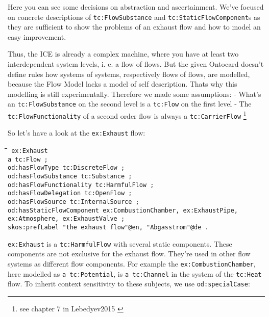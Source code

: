 \documentclass[a4paper,11pt]{article}
\newenvironment{code}{\tt \begin{tabbing}
\hskip12pt\=\hskip12pt\=\hskip12pt\=\hskip12pt\=\hskip5cm\=\hskip5cm\=\kill}
{\end{tabbing}}
\begin{document}
\begin{itemize}
    Here you can see some decisions on abstraction and ascertainment. We've
    focused on concrete descriptions of \texttt{tc:FlowSubstance} and
    \texttt{tc:StaticFlowComponent}s as they are sufficient to show the 
    problems of an exhaust flow and how to model an easy improvement.

    Thus, the ICE is already a complex machine, where you have at least
    two interdependent system levels, i. e. a flow of flows. But the given 
    Ontocard doesn't define rules how systems of systems, respectively flows 
    of flows, are modelled, because the Flow Model lacks a model of self 
    description. Thats why this modelling is still experimentally. Therefore we
    made some assumptions:
    - What's an \texttt{tc:FlowSubstance} on the second level is a 
    \texttt{tc:Flow} on the first level
    - The \texttt{tc:FlowFunctionality} of a second order flow is always a 
    \texttt{tc:CarrierFlow} \footnote{see chapter 7 in Lebedyev2015 
    \cite{Lebedyev2015} }

    So let's have a look at the \texttt{ex:Exhaust} flow:
    \begin{code}\tt
        ex:Exhaust \\
        \> a tc:Flow ; \\
        \> od:hasFlowType tc:DiscreteFlow ; \\
        \> od:hasFlowSubstance tc:Substance ; \\
        \> od:hasFlowFunctionality tc:HarmfulFlow ; \\
        \> od:hasFlowDelegation tc:OpenFlow ; \\
        \> od:hasFlowSource tc:InternalSource ; \\
        \> od:hasStaticFlowComponent ex:CombustionChamber, ex:ExhaustPipe, \\
        \> ex:Atmosphere, ex:ExhaustValve ; \\
        \> skos:prefLabel "the exhaust flow"@en, "Abgasstrom"@de . \\
    \end{code}

    \texttt{ex:Exhaust} is a \texttt{tc:HarmfulFlow} with several static 
    components. These components are not exclusive for the exhaust flow.
    They're used in other flow systems as different flow components. For
    example the \texttt{ex:CombustionChamber}, here modelled as
    \texttt{a tc:Potential}, is \texttt{a tc:Channel} in the system of the
    \texttt{tc:Heat} flow. To inherit context sensitivity to these 
    subjects, we use \texttt{od:specialCase}: \cite{RDFC}
    

\end{itemize}
\end{document}
